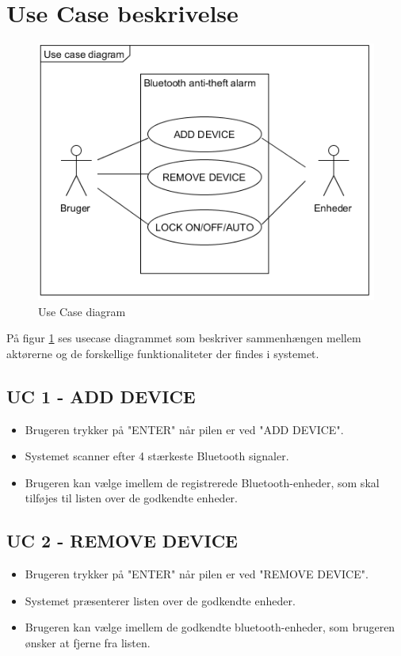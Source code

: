 \section{Use Case beskrivelse}

\begin{figure}[H]
	\centering
	\includegraphics[width = 300 pt]{Img/Usecase_Diagram.png}
	\caption{Use Case diagram}
	\label{fig:Usecase diagram}
\end{figure}

På figur \ref{fig:Usecase diagram} ses usecase diagrammet som beskriver sammenhængen mellem aktørerne og de forskellige funktionaliteter der findes i systemet.

\subsection{UC 1 - ADD DEVICE}
\begin{itemize}
\item Brugeren trykker på "ENTER" når pilen er ved "ADD DEVICE".
\item Systemet scanner efter 4 stærkeste Bluetooth signaler.
\item Brugeren kan vælge imellem de registrerede Bluetooth-enheder, som skal tilføjes til listen over de godkendte enheder.
\end{itemize}


\subsection{UC 2 - REMOVE DEVICE}

\begin{itemize}
	\item Brugeren trykker på "ENTER" når pilen er ved "REMOVE DEVICE".
	\item Systemet præsenterer listen over de godkendte enheder.
	\item Brugeren kan vælge imellem de godkendte bluetooth-enheder, som brugeren ønsker at fjerne fra listen.
\end{itemize} 

